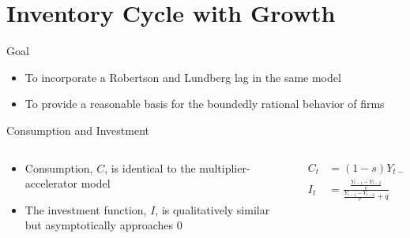 \documentclass{beamer}
\begin{document}

\section*{Inventory Cycle with Growth}
\begin{frame}{Goal}
	\begin{itemize}
		\item To incorporate a Robertson and Lundberg lag in the same model
		\item To provide a reasonable basis for the boundedly rational behavior of firms
	\end{itemize}
\end{frame}

\begin{frame}{Consumption and Investment}
	\begin{columns}
	\begin{column}{0.5\textwidth}
		\begin{itemize}
			\item Consumption, $C$, is identical to the multiplier-accelerator model
			\item The investment function, $I$, is qualitatively similar but asymptotically approaches 0
		\end{itemize}
	\end{column}
	\begin{column}{0.5\textwidth}
		\begin{align*}
			C_t &= (1-s)Y_{t-1}+sY_{t-2}\\
			I_t &= \frac{\frac{Y_{t-1}-Y_{t-2}}{v}}{\frac{Y_{t-1}-Y_{t-2}}{v}+q}
		\end{align*}
	\end{column}
	\end{columns}
\end{frame}
\end{document}
